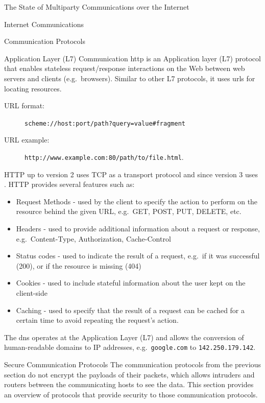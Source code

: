 \begin{frame}[fragile]{The State of Multiparty Communications over the
Internet}
\begin{block}{Internet Communications}
\begin{block}{Communication Protocols}
\begin{block}{Application Layer (L7) Communication}
\protect\hypertarget{application-layer-l7-communication}{}
\gls{http} is an Application layer (L7) protocol that enables stateless
request/response interactions on the Web between web servers and clients
(e.g.~browsers). Similar to other L7 protocols, it uses \glspl{url} for
locating resources.

\begin{description}
\item[URL format:]
\texttt{scheme://host:port/path?query=value\#fragment}
\item[URL example:]
\texttt{http://www.example.com:80/path/to/file.html}.
\end{description}

HTTP up to version 2 uses TCP as a transport protocol and since version
3 uses . HTTP provides several features such as:

\begin{itemize}
\tightlist
\item
  Request Methods - used by the client to specify the action to perform
  on the resource behind the given URL, e.g.~GET, POST, PUT, DELETE,
  etc.
\item
  Headers - used to provide additional information about a request or
  response, e.g.~Content-Type, Authorization, Cache-Control
\item
  Status codes - used to indicate the result of a request, e.g.~if it
  was successful (200), or if the resource is missing (404)
\item
  Cookies - used to include stateful information about the user kept on
  the client-side
\item
  Caching - used to specify that the result of a request can be cached
  for a certain time to avoid repeating the request's action.
\end{itemize}

The \gls{dns} operates at the Application Layer (L7) and allows the
conversion of human-readable domains to IP addresses,
e.g.~\texttt{google.com} to \texttt{142.250.179.142}.
\end{block}
\end{block}

\begin{block}{Secure Communication Protocols}
\protect\hypertarget{secure-communication-protocols}{}
The communication protocols from the previous section do not encrypt the
payloads of their packets, which allows intruders and routers between
the communicating hosts to see the data. This section provides an
overview of protocols that provide security to those communication
protocols.


\end{block}
\end{block}
\end{frame}
